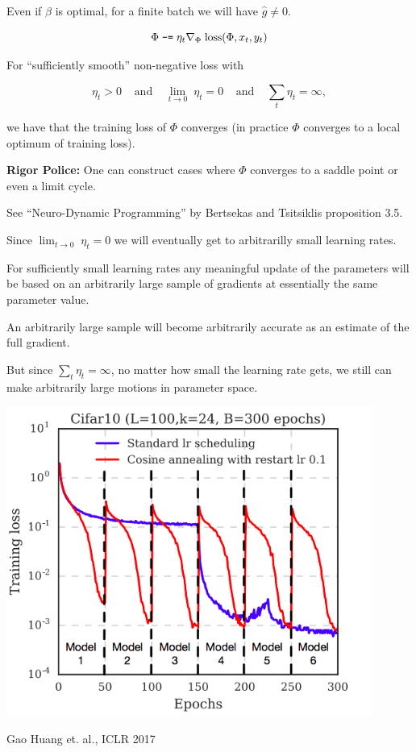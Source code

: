 {\vfill
Even if $\beta$ is optimal, for a finite batch we will have $\hat{g} \not = 0$.


$$\Phi \;\mbox{\tt -=} \; \eta_t \nabla_\Phi\;\mathrm{loss}(\Phi,x_t,y_t)$$

\vfill
For ``sufficiently smooth'' non-negative loss with

\vfill
$$\eta_t > 0\;\;\;\;\mbox{and}\;\;\;\;\lim_{t \rightarrow 0} \;\eta_t = 0\;\;\;\;\mbox{and}\;\;\;\;\sum_t \eta_t = \infty,$$

\vfill
we have that the training loss of $\Phi$ converges (in practice $\Phi$ converges to a local optimum of training loss).

\vfill
{\Large {\bf Rigor Police:} One can construct cases where $\Phi$ converges to a saddle point or even a limit cycle.}

\vfill
{\Large See ``Neuro-Dynamic Programming'' by Bertsekas and Tsitsiklis proposition 3.5.}


Since $\lim_{t \rightarrow 0} \;\eta_t = 0$ we will eventually get to arbitrarilly small learning rates.

\vfill
For sufficiently small learning rates any meaningful update of the parameters will be based on an arbitrarily large sample
of gradients at essentially the same parameter value.

\vfill
An arbitrarily large sample will become arbitrarily accurate as an estimate of the full gradient.

\vfill
But since $\sum_t \eta_t = \infty$, no matter how small the learning rate gets, we still can make arbitrarily large motions in parameter space.


\centerline{\includegraphics[height= 4in]{../images/AnnealingSGD}}
\centerline{\Large Gao Huang et. al., ICLR 2017}

}
